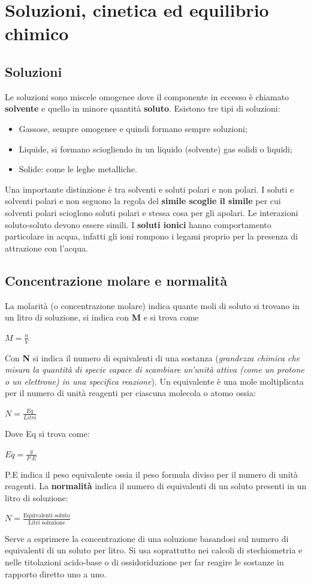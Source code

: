 \documentclass[11pt, a4paper, openright]{book}
\begin{document}
\chapter{Soluzioni, cinetica ed equilibrio chimico}

\section{Soluzioni}
Le soluzioni sono miscele omogenee dove il componente in eccesso è chiamato \textbf{solvente} e quello in minore quantità \textbf{soluto}.
Esistono tre tipi di soluzioni:
\begin{itemize}
    \item Gassose, sempre omogenee e quindi formano sempre soluzioni;
    \item Liquide, si formano sciogliendo in un liquido (solvente) gas solidi o liquidi;
    \item Solide: come le leghe metalliche.
\end{itemize}
Una importante distinzione è tra solventi e soluti polari e non polari.
I soluti e solventi polari e non seguono la regola del \textbf{simile scoglie il simile} per cui solventi polari scioglono soluti polari e stessa cosa per gli apolari.
Le interazioni soluto-soluto devono essere simili.
I \textbf{soluti ionici} hanno comportamento particolare in acqua, infatti gli ioni rompono i legami proprio per la presenza di attrazione con l'acqua.
\section{Concentrazione molare e normalità}
La molarità (o concentrazione molare) indica quante moli di soluto si trovano in un litro di soluzione, si indica con \textbf{M} e si trova come\begin{center}
    $M = \frac{n}{V}$
\end{center}
Con \textbf{N} si indica il numero di equivalenti di una sostanza (\textit{grandezza chimica che misura la quantità di specie capace di scambiare un'unità attiva (come un protone o un elettrone) in una specifica reazione}).
Un equivalente è una mole moltiplicata per il numero di unità reagenti per ciascuna molecola o atomo ossia:
\begin{center}
    $N = \frac{Eq}{Litri}$
\end{center}
Dove Eq si trova come:
\begin{center}
    $Eq= \frac{g}{P.E}$
\end{center}
P.E indica il peso equivalente ossia il peso formula diviso per il numero di unità reagenti.
La \textbf{normalità} indica il numero di equivalenti di un soluto presenti in un litro di soluzione:
\begin{center}
    $N = \frac{\text{Equivalenti soluto} }{\text{Litri soluzione}}$
\end{center}
 Serve a esprimere la concentrazione di una soluzione basandosi sul numero di equivalenti di un soluto per litro. Si usa soprattutto nei calcoli di stechiometria e nelle titolazioni acido-base o di ossidoriduzione per far reagire le sostanze in rapporto diretto uno a uno.
\end{document}
